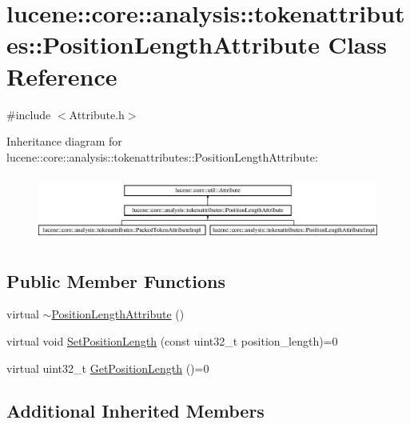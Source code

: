 \hypertarget{classlucene_1_1core_1_1analysis_1_1tokenattributes_1_1PositionLengthAttribute}{}\section{lucene\+:\+:core\+:\+:analysis\+:\+:tokenattributes\+:\+:Position\+Length\+Attribute Class Reference}
\label{classlucene_1_1core_1_1analysis_1_1tokenattributes_1_1PositionLengthAttribute}


{\ttfamily \#include $<$Attribute.\+h$>$}

Inheritance diagram for lucene\+:\+:core\+:\+:analysis\+:\+:tokenattributes\+:\+:Position\+Length\+Attribute\+:\begin{figure}[H]
\begin{center}
\leavevmode
\includegraphics[height=2.176166cm]{classlucene_1_1core_1_1analysis_1_1tokenattributes_1_1PositionLengthAttribute}
\end{center}
\end{figure}
\subsection*{Public Member Functions}
\begin{DoxyCompactItemize}
\item 
virtual \mbox{\hyperlink{classlucene_1_1core_1_1analysis_1_1tokenattributes_1_1PositionLengthAttribute_a1a1260d8ec8ea8d25dda405698268d3f}{$\sim$\+Position\+Length\+Attribute}} ()
\item 
virtual void \mbox{\hyperlink{classlucene_1_1core_1_1analysis_1_1tokenattributes_1_1PositionLengthAttribute_a514415965bae0dd392cbb8d65ea4d808}{Set\+Position\+Length}} (const uint32\+\_\+t position\+\_\+length)=0
\item 
virtual uint32\+\_\+t \mbox{\hyperlink{classlucene_1_1core_1_1analysis_1_1tokenattributes_1_1PositionLengthAttribute_a6325424899959bb480f161e0d5490bfd}{Get\+Position\+Length}} ()=0
\end{DoxyCompactItemize}
\subsection*{Additional Inherited Members}


